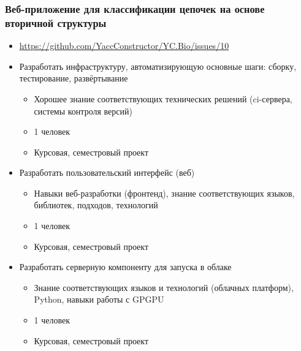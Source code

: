 \documentclass{beamer}
\begin{document}
\begin{frame}[fragile]
\transwipe[direction=90]
\frametitle{Веб-приложение для классификации цепочек на основе вторичной структуры}
  \begin{itemize}
    \item \footnotesize{\url{https://github.com/YaccConstructor/YC.Bio/issues/10}}
    \item Разработать инфраструктуру, автоматизирующую основные шаги: сборку, тестирование, развёртывание
    \begin{itemize}
       \item Хорошее знание соответствующих технических решений (ci-сервера, системы контроля версий)
       \item 1 человек
       \item Курсовая, семестровый проект
    \end{itemize}
    \item Разработать пользовательский интерфейс (веб)
    \begin{itemize}
       \item Навыки веб-разработки (фронтенд), знание соответствующих языков, библиотек, подходов, технологий
       \item 1 человек
       \item Курсовая, семестровый проект
    \end{itemize}
    \item Разработать серверную компоненту для запуска в облаке
    \begin{itemize}
       \item Знание соответствующих языков и технологий (облачных платформ), Python, навыки работы с GPGPU
       \item 1 человек
       \item Курсовая, семестровый проект
    \end{itemize}
  \end{itemize}  
\end{frame}
\end{document}
